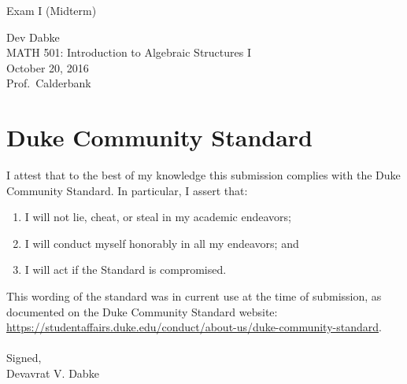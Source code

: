 \documentclass[letterpaper]{article}
\def\name{Exam I (Midterm)}
\begin{document}
{\huge \name}


\vspace{0.25in}

Dev Dabke \\
MATH 501: Introduction to Algebraic Structures I \\
October 20, 2016 \\
Prof.\ Calderbank \\

\section*{Duke Community Standard}

I attest that to the best of my knowledge this submission complies with the Duke Community Standard.
In particular, I assert that:
\begin{enumerate}
    \item I will not lie, cheat, or steal in my academic endeavors;
    \item I will conduct myself honorably in all my endeavors; and
    \item I will act if the Standard is compromised.
\end{enumerate}
This wording of the standard was in current use at the time of submission, as documented on the Duke Community Standard website: \href{https://studentaffairs.duke.edu/conduct/about-us/duke-community-standard}{https://studentaffairs.duke.edu/conduct/about-us/duke-community-standard}.
\\ \\
Signed, \\
Devavrat V. Dabke
\end{document}
